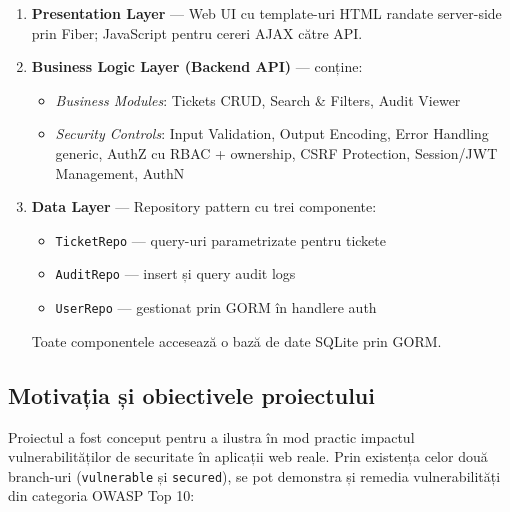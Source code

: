 \documentclass[12pt]{article}
\begin{document}
\begin{enumerate}
    \item \textbf{Presentation Layer} --- Web UI cu template-uri HTML randate server-side prin Fiber;
    JavaScript pentru cereri AJAX către API.

    \item \textbf{Business Logic Layer (Backend API)} --- conține:
    \begin{itemize}
        \item \textit{Business Modules}: Tickets CRUD, Search \& Filters, Audit Viewer
        \item \textit{Security Controls}: Input Validation, Output Encoding, Error Handling generic,
        AuthZ cu RBAC + ownership, CSRF Protection, Session/JWT Management, AuthN
    \end{itemize}

    \item \textbf{Data Layer} --- Repository pattern cu trei componente:
    \begin{itemize}
        \item \texttt{TicketRepo} --- query-uri parametrizate pentru tickete
        \item \texttt{AuditRepo} --- insert și query audit logs
        \item \texttt{UserRepo} --- gestionat prin GORM în handlere auth
    \end{itemize}
    Toate componentele accesează o bază de date SQLite prin GORM.
\end{enumerate}

\subsection{Motivația și obiectivele proiectului}

Proiectul a fost conceput pentru a ilustra în mod practic impactul vulnerabilităților de securitate
în aplicații web reale. Prin existența celor două branch-uri (\texttt{vulnerable} și \texttt{secured}),
se pot demonstra și remedia vulnerabilități din categoria OWASP Top 10:
\end{document}

